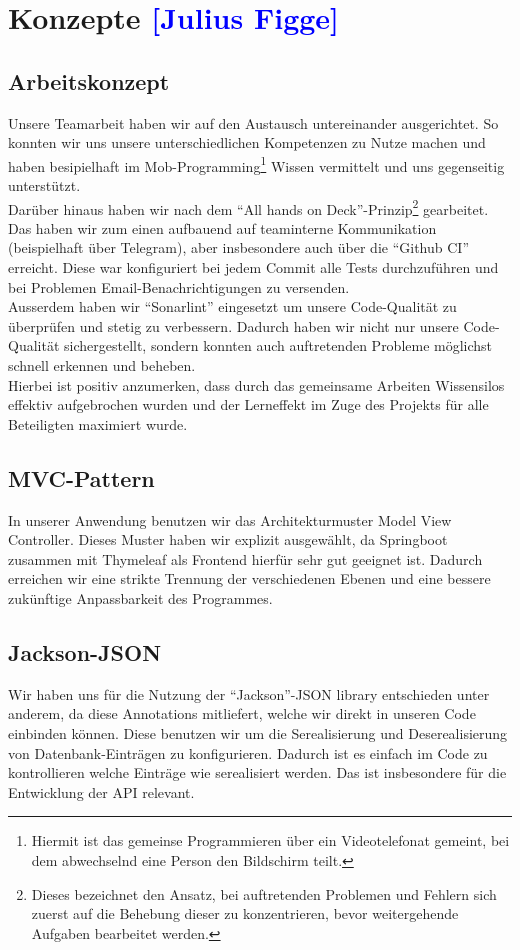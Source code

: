 

\section{Konzepte \textcolor{blue}{[Julius Figge]}}

\subsection{Arbeitskonzept}
\label{Arbeitskonzept}
Unsere Teamarbeit haben wir auf den Austausch untereinander ausgerichtet.
So konnten wir uns unsere unterschiedlichen Kompetenzen zu Nutze machen und haben besipielhaft im Mob-Programming\footnote{Hiermit ist das gemeinse Programmieren über ein Videotelefonat gemeint, bei dem abwechselnd eine Person den Bildschirm teilt.} Wissen vermittelt und uns gegenseitig unterstützt.\\
Darüber hinaus haben wir nach dem \enquote{All hands on Deck}-Prinzip\footnote{Dieses bezeichnet den Ansatz, bei auftretenden Problemen und Fehlern sich zuerst auf die Behebung dieser zu konzentrieren, bevor weitergehende Aufgaben bearbeitet werden.} gearbeitet.\\
Das haben wir zum einen aufbauend auf teaminterne Kommunikation (beispielhaft über Telegram), aber insbesondere auch über die \enquote{Github CI} erreicht.
Diese war konfiguriert bei jedem Commit alle Tests durchzuführen und bei Problemen Email-Benachrichtigungen zu versenden.\\
Ausserdem haben wir \enquote{Sonarlint} eingesetzt um unsere Code-Qualität zu überprüfen und stetig zu verbessern.
Dadurch haben wir nicht nur unsere Code-Qualität sichergestellt, sondern konnten auch auftretenden Probleme möglichst schnell erkennen und beheben.\\
Hierbei ist positiv anzumerken, dass durch das gemeinsame Arbeiten Wissensilos effektiv aufgebrochen wurden und der Lerneffekt im Zuge des Projekts für alle Beteiligten maximiert wurde.

\subsection{MVC-Pattern}
In unserer Anwendung benutzen wir das Architekturmuster Model View Controller.
Dieses Muster haben wir explizit ausgewählt, da Springboot zusammen mit Thymeleaf als Frontend hierfür sehr gut geeignet ist. Dadurch erreichen wir eine strikte Trennung der verschiedenen Ebenen und eine bessere zukünftige Anpassbarkeit des Programmes.

\subsection{Jackson-JSON}
Wir haben uns für die Nutzung der \enquote{Jackson}-JSON library entschieden unter anderem, da diese Annotations mitliefert, welche wir direkt in unseren Code einbinden können. Diese benutzen wir um die Serealisierung und Deserealisierung von Datenbank-Einträgen zu konfigurieren. Dadurch ist es einfach im Code zu kontrollieren welche Einträge wie serealisiert werden. Das ist insbesondere für die Entwicklung der API relevant.
